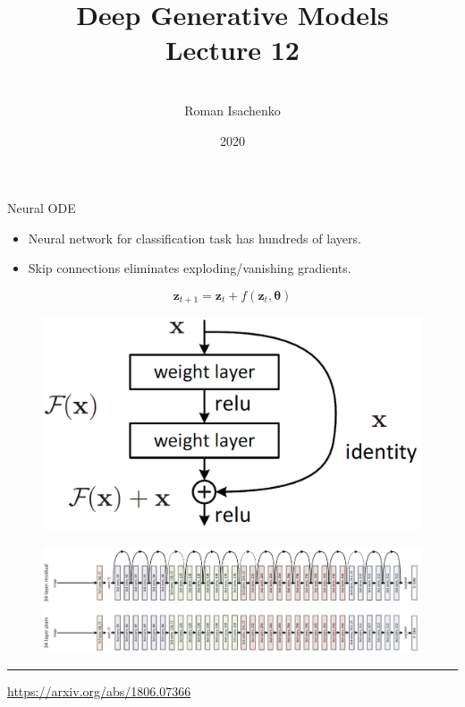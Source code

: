 \documentclass{beamer}
\title[\hbox to 56mm{Deep Generative Models  \hfill\insertframenumber\,/\,\inserttotalframenumber}]
{Deep Generative Models \\ Lecture 12}
\author[Roman Isachenko]{\\Roman Isachenko}
\institute[MIPT]{Moscow Institute of Physics and Technology \\
}
\date{2020}
\newcommand{\bz}{\mathbf{z}}
\newcommand{\btheta}{\boldsymbol{\theta}}
\begin{document}
\begin{frame}
\titlepage
\end{frame}
\begin{frame}{Neural ODE}
\begin{minipage}[t]{0.6\columnwidth}
\vspace{0.2cm}
\begin{itemize}
	\item Neural network for classification task has hundreds of layers.
	\item Skip connections eliminates exploding/vanishing gradients.
\end{itemize}
\[
	\bz_{t + 1} = \bz_t + f(\bz_t, \btheta)
\]
\end{minipage}%
\begin{minipage}[t]{0.4\columnwidth}
\begin{figure}
    \centering
    \includegraphics[width=0.95\linewidth]{figs/resnet_1.png}
\end{figure}
\end{minipage}
\begin{figure}
    \centering
    \includegraphics[width=\linewidth]{figs/resnet_2.png}
\end{figure}
\vfill
\hrule\medskip
{\scriptsize \href{https://arxiv.org/abs/1806.07366}{https://arxiv.org/abs/1806.07366}}   
\end{frame}
\end{document}
